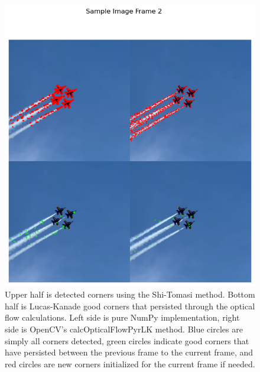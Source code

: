 \documentclass[11pt, conference, letterpaper]{IEEEtran}
\begin{document}
\begin{figure}[h]
    \centering
    \includegraphics[width=0.8\linewidth]{images/sample_image_2.png}
    \caption{Upper half is detected corners using the Shi-Tomasi method. Bottom half is Lucas-Kanade good corners that persisted through the optical flow calculations. Left side is pure NumPy implementation, right side is OpenCV's calcOpticalFlowPyrLK method. Blue circles are simply all corners detected, green circles indicate good corners that have persisted between the previous frame to the current frame, and red circles are new corners initialized for the current frame if needed.}
    \label{fig:sample_3}
\end{figure}
\end{document}
